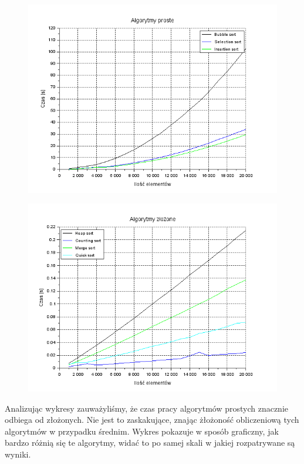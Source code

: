 \documentclass{article}
\begin{document}
\begin{figure}[h]
\centering
\begin{minipage}{.5\textwidth}
  \centering
  \includegraphics[width=1\linewidth]{proste}
  \label{fig:proste}
\end{minipage}%
\begin{minipage}{.5\textwidth}
  \centering
  \includegraphics[width=1\linewidth]{zlozone}
  \label{fig:zlozone}
\end{minipage}
\end{figure}

Analizując wykresy zauważyliśmy, że czas pracy algorytmów prostych znacznie odbiega od złożonych. Nie jest to zaskakujące, znając żłożoność obliczeniową tych algorytmów w przypadku średnim. Wykres pokazuje w sposób graficzny, jak bardzo różnią się te algorytmy, widać to po samej skali w jakiej rozpatrywane są wyniki.
\end{document}
